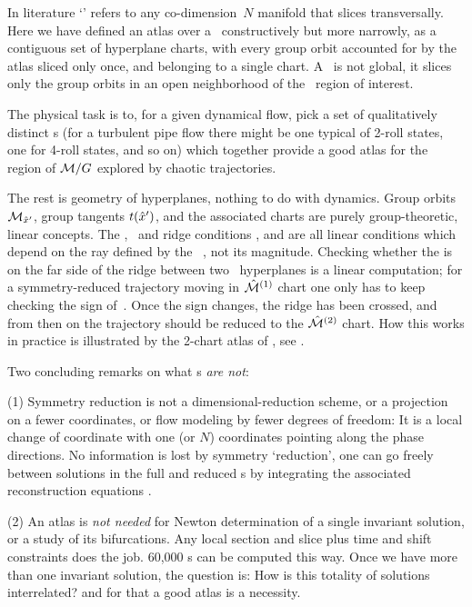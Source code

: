 \documentclass[aip,cha,reprint,
secnumarabic,
nofootinbib, tightenlines,
nobibnotes, showkeys, showpacs,
groupedaddress
]{revtex4-1}
\begin{document}
In literature `\slice' refers to any
co-dimension~$N$ manifold that slices transversally. Here we have defined
an atlas over a \slice\ constructively but more narrowly, as a contiguous
set of hyperplane charts, with every group orbit accounted for by the
atlas sliced only once, and belonging to a single chart. A \slice\ is not
global, it slices only the group orbits in an open neighborhood of the
\statesp\ region of interest.

The physical task is to, for a given dynamical flow, pick a set of
qualitatively distinct {\template s} (for a turbulent pipe
flow there might be one typical of 2-roll states, one for 4-roll states, and so on)
which together provide a good atlas for the region of ${\cal M}/G$
explored by chaotic trajectories.

The rest is geometry of hyperplanes, nothing to do with dynamics. Group
orbits ${\cal M}_{{\hat{x}'}}$, group tangents $t({\hat{x}'})$, and the
associated charts are purely group-theoretic, linear concepts. The
\slice, \chartBord\ and ridge conditions ,
 and  are all linear conditions which
depend on the ray defined by the \template\ \slicep, not its magnitude.
Checking whether the {\chartBord} is on the far side of the ridge between
two \slice\ hyperplanes is a linear computation; for a symmetry-reduced
trajectory moving in $\hat{\cal M}{}^{(1)}$ chart one only has to keep checking
the sign of
\beq
{}
\,.
Once the sign changes, the ridge has been crossed, and from then on
the trajectory should be reduced to the $\hat{\cal M}{}^{(2)}$ chart.
How this works in practice is illustrated by the 2-chart atlas of
\cLe, see .

Two concluding remarks on what \slice s \emph{are not}:

(1) Symmetry reduction is not a dimensional-reduction scheme, or a
projection on a fewer coordinates, or flow modeling by fewer degrees of
freedom: It is a local change of coordinate with one (or $N$)
coordinates pointing along the phase directions. No information is lost
by symmetry `reduction', one can go freely between solutions in the full
and reduced \statesp s by integrating the associated {reconstruction
equations} .

(2) An atlas is \emph{not needed} for Newton determination of a single
invariant solution, or a study of its bifurcations. Any local
section and slice plus time and shift constraints does the job. 60,000
\rpo s can be computed this way. Once we have more than one
invariant solution, the question is: How is this totality of solutions
interrelated? and for that a good atlas is a necessity.
\end{document}
